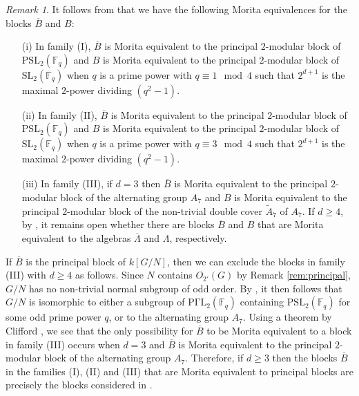 \documentclass{amsart}
\theoremstyle{plain}
\theoremstyle{definition}
\theoremstyle{remark}
\newtheorem{rem}[thm]{Remark}
\begin{document}
\begin{rem}
\label{rem:oherdmann}
It follows from \cite{erd} that we have the following Morita equivalences for the blocks
$\overline{B}$ and $B$: 
\begin{enumerate}
\item[(i)] In family (I), $\overline{B}$ is Morita equivalent to the principal $2$-modular block of 
$\mathrm{PSL}_2(\mathbb{F}_q)$ and $B$ is Morita equivalent to the principal $2$-modular 
block of $\mathrm{SL}_2(\mathbb{F}_q)$ when $q$ is a prime power with $q\equiv 1 \mod 4$ such that
$2^{d+1}$ is the maximal $2$-power dividing $(q^2-1)$.
\item[(ii)] In family (II), $\overline{B}$ is Morita equivalent to the principal $2$-modular block of 
$\mathrm{PSL}_2(\mathbb{F}_q)$ and $B$ is Morita equivalent to the principal $2$-modular 
block of $\mathrm{SL}_2(\mathbb{F}_q)$ when $q$ is a prime power with $q\equiv 3 \mod 4$ such that
$2^{d+1}$ is the maximal $2$-power dividing $(q^2-1)$.
\item[(iii)] In family (III), if $d=3$ then $\overline{B}$ is Morita equivalent to the principal $2$-modular 
block of the alternating group $A_7$ and $B$ is Morita equivalent to the principal $2$-modular block 
of the non-trivial double cover $\tilde{A}_7$ of  $A_7$. If $d\ge 4$, by \cite[\S X.4]{erd}, it remains
open whether there are blocks $\overline{B}$ and $B$ that are Morita equivalent to the algebras
$\overline{\Lambda}$ and $\Lambda$, respectively.
\end{enumerate}
If $\overline{B}$ is the principal block of $k[G/N]$, then we can exclude the blocks in family (III) 
with $d\ge 4$ as follows. Since $N$ contains $O_{2'}(G)$ by Remark \ref{rem:principal}, $G/N$ 
has no non-trivial normal subgroup of odd order. 
By \cite{gowa}, it then follows that $G/N$ is isomorphic to either a subgroup of 
$\mathrm{P\Gamma L}_2(\mathbb{F}_q)$ containing $\mathrm{PSL}_2(\mathbb{F}_q)$ for some odd 
prime power $q$, or to the alternating group $A_7$. Using a theorem by Clifford 
\cite[Hauptsatz V.17.3]{hup}, we see that the only possibility for $\overline{B}$ to be Morita 
equivalent to a block in family (III) occurs when $d=3$ and $\overline{B}$ is Morita 
equivalent to the principal $2$-modular block of the alternating group $A_7$.
Therefore, if $d\ge 3$ then the blocks $\overline{B}$ in the families  (I), (II) and (III) that are Morita
equivalent to principal blocks are precisely the blocks considered in \cite{3sim}.
\end{rem}
\end{document}
